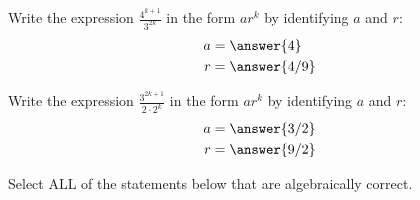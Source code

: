 \documentclass{ximera}
\begin{document}
\begin{problem}
  Write the expression $\frac{4^{k+1}}{3^{2k}}$ in the form $a r^k$ by identifying $a$ and $r$:
  \begin{align*}
    a &= \answer{4} \\  
    r &= \answer{4/9}
  \end{align*}
\end{problem}

\begin{problem}
  Write the expression $\frac{3^{2k + 1}}{2 \cdot 2^k}$ in the form $a r^k$ by identifying $a$ and $r$:
  \begin{align*}
    a &= \answer{3/2}\\
    r &= \answer{9/2}
  \end{align*}
\end{problem}

\begin{problem}
  Select ALL of the statements below that are algebraically correct.
  \begin{selectAll}
  \end{selectAll}
\end{problem}
\end{document}
